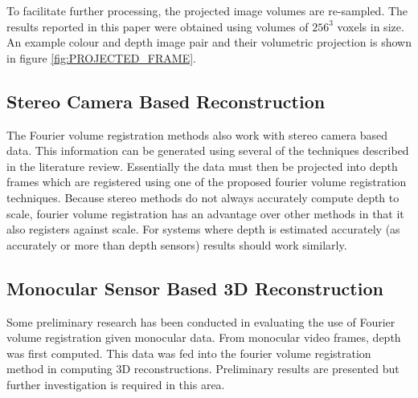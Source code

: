 To facilitate further processing, the projected image volumes are re-sampled. The results reported in this paper were obtained using volumes of $256^3$ voxels in size. An example colour and depth image pair and their volumetric projection is shown in figure \ref{fig:PROJECTED_FRAME}.  \\


\subsection{Stereo Camera Based Reconstruction}

The Fourier volume registration methods also work with stereo camera based data. This information can be generated using several of the techniques described in the literature review. Essentially the data must then be projected into depth frames which are registered using one of the proposed fourier volume registration techniques. Because stereo methods do not always accurately compute depth to scale, fourier volume registration has an advantage over other methods in that it also registers against scale. For systems where depth is estimated accurately (as accurately or more than depth sensors) results should work similarly.

\subsection{Monocular Sensor Based 3D Reconstruction}

Some preliminary research has been conducted in evaluating the use of Fourier volume registration given monocular data. From monocular video frames, depth was first computed. This data was fed into the fourier volume registration method in computing 3D reconstructions. Preliminary results are presented but further investigation is required in this area.

